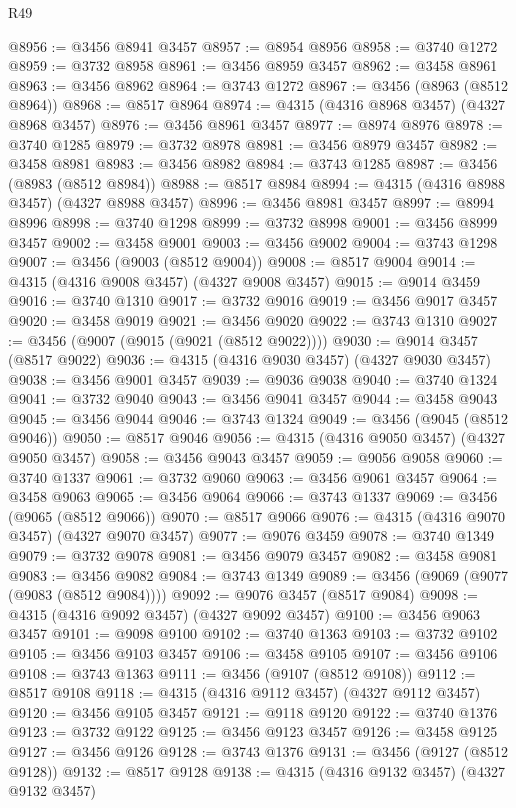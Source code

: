 \begin{lexlean}{R49}
\begin{coremodule}
@8956 := @3456 @8941 @3457
@8957 := @8954 @8956
@8958 := @3740 @1272
@8959 := @3732 @8958
@8961 := @3456 @8959 @3457
@8962 := @3458 @8961
@8963 := @3456 @8962
@8964 := @3743 @1272
@8967 := @3456 (@8963 (@8512 @8964))
@8968 := @8517 @8964
@8974 := @4315 (@4316 @8968 @3457) (@4327 @8968 @3457)
@8976 := @3456 @8961 @3457
@8977 := @8974 @8976
@8978 := @3740 @1285
@8979 := @3732 @8978
@8981 := @3456 @8979 @3457
@8982 := @3458 @8981
@8983 := @3456 @8982
@8984 := @3743 @1285
@8987 := @3456 (@8983 (@8512 @8984))
@8988 := @8517 @8984
@8994 := @4315 (@4316 @8988 @3457) (@4327 @8988 @3457)
@8996 := @3456 @8981 @3457
@8997 := @8994 @8996
@8998 := @3740 @1298
@8999 := @3732 @8998
@9001 := @3456 @8999 @3457
@9002 := @3458 @9001
@9003 := @3456 @9002
@9004 := @3743 @1298
@9007 := @3456 (@9003 (@8512 @9004))
@9008 := @8517 @9004
@9014 := @4315 (@4316 @9008 @3457) (@4327 @9008 @3457)
@9015 := @9014 @3459
@9016 := @3740 @1310
@9017 := @3732 @9016
@9019 := @3456 @9017 @3457
@9020 := @3458 @9019
@9021 := @3456 @9020
@9022 := @3743 @1310
@9027 := @3456 (@9007 (@9015 (@9021 (@8512 @9022))))
@9030 := @9014 @3457 (@8517 @9022)
@9036 := @4315 (@4316 @9030 @3457) (@4327 @9030 @3457)
@9038 := @3456 @9001 @3457
@9039 := @9036 @9038
@9040 := @3740 @1324
@9041 := @3732 @9040
@9043 := @3456 @9041 @3457
@9044 := @3458 @9043
@9045 := @3456 @9044
@9046 := @3743 @1324
@9049 := @3456 (@9045 (@8512 @9046))
@9050 := @8517 @9046
@9056 := @4315 (@4316 @9050 @3457) (@4327 @9050 @3457)
@9058 := @3456 @9043 @3457
@9059 := @9056 @9058
@9060 := @3740 @1337
@9061 := @3732 @9060
@9063 := @3456 @9061 @3457
@9064 := @3458 @9063
@9065 := @3456 @9064
@9066 := @3743 @1337
@9069 := @3456 (@9065 (@8512 @9066))
@9070 := @8517 @9066
@9076 := @4315 (@4316 @9070 @3457) (@4327 @9070 @3457)
@9077 := @9076 @3459
@9078 := @3740 @1349
@9079 := @3732 @9078
@9081 := @3456 @9079 @3457
@9082 := @3458 @9081
@9083 := @3456 @9082
@9084 := @3743 @1349
@9089 := @3456 (@9069 (@9077 (@9083 (@8512 @9084))))
@9092 := @9076 @3457 (@8517 @9084)
@9098 := @4315 (@4316 @9092 @3457) (@4327 @9092 @3457)
@9100 := @3456 @9063 @3457
@9101 := @9098 @9100
@9102 := @3740 @1363
@9103 := @3732 @9102
@9105 := @3456 @9103 @3457
@9106 := @3458 @9105
@9107 := @3456 @9106
@9108 := @3743 @1363
@9111 := @3456 (@9107 (@8512 @9108))
@9112 := @8517 @9108
@9118 := @4315 (@4316 @9112 @3457) (@4327 @9112 @3457)
@9120 := @3456 @9105 @3457
@9121 := @9118 @9120
@9122 := @3740 @1376
@9123 := @3732 @9122
@9125 := @3456 @9123 @3457
@9126 := @3458 @9125
@9127 := @3456 @9126
@9128 := @3743 @1376
@9131 := @3456 (@9127 (@8512 @9128))
@9132 := @8517 @9128
@9138 := @4315 (@4316 @9132 @3457) (@4327 @9132 @3457)

\end{coremodule}
\end{lexlean}
